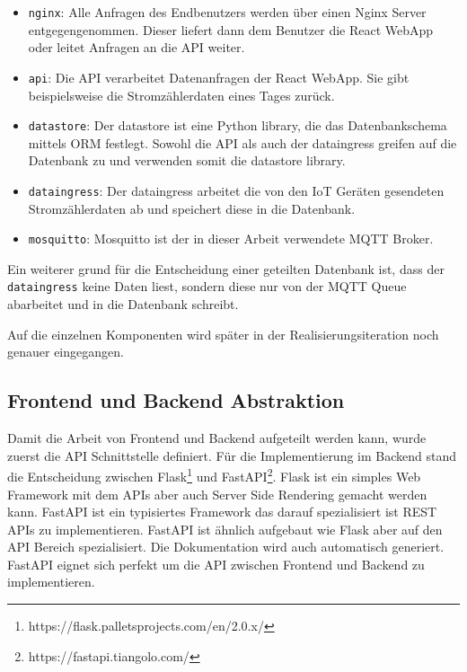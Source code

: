 \begin{itemize}
    \item \texttt{nginx}:
          Alle Anfragen des Endbenutzers werden über einen Nginx Server
          entgegengenommen. Dieser liefert dann dem Benutzer die React WebApp
          oder leitet Anfragen an die \ac{API} weiter.

    \item \texttt{api}:
          Die \ac{API} verarbeitet Datenanfragen der React WebApp. Sie gibt
          beispielsweise die Stromzählerdaten eines Tages zurück.

    \item \texttt{datastore}:
          Der datastore ist eine Python library, die das Datenbankschema mittels \ac{ORM} festlegt.
          Sowohl die \ac{API} als auch der dataingress greifen auf die Datenbank zu
          und verwenden somit die datastore library.

    \item \texttt{dataingress}:
          Der dataingress arbeitet die von den \ac{IoT} Geräten gesendeten
          Stromzählerdaten ab und speichert diese in die Datenbank.

    \item \texttt{mosquitto}:
          Mosquitto ist der in dieser Arbeit verwendete \ac{MQTT} Broker.
\end{itemize}

Ein weiterer grund für die Entscheidung einer geteilten Datenbank ist,
dass der \texttt{dataingress} keine Daten liest, sondern diese nur von
der \ac{MQTT} Queue abarbeitet und in die Datenbank schreibt.

Auf die einzelnen Komponenten wird später in der Realisierungsiteration noch genauer
eingegangen.



\subsection{Frontend und Backend Abstraktion}

Damit die Arbeit von Frontend und Backend aufgeteilt werden kann, wurde zuerst
die \ac{API} Schnittstelle definiert. Für die Implementierung im Backend
stand die Entscheidung zwischen Flask\footnote{https://flask.palletsprojects.com/en/2.0.x/}
und FastAPI\footnote{https://fastapi.tiangolo.com/}.
Flask ist ein simples Web Framework mit dem \ac{API}s aber auch Server Side Rendering \cite{flask_server_side}
gemacht werden kann. FastAPI ist ein typisiertes Framework das darauf spezialisiert ist
\ac{REST} \ac{API}s zu implementieren. FastAPI ist ähnlich aufgebaut wie Flask aber auf den
\ac{API} Bereich spezialisiert. Die Dokumentation wird auch automatisch generiert.
FastAPI eignet sich perfekt um die \ac{API} zwischen Frontend und Backend zu implementieren.


